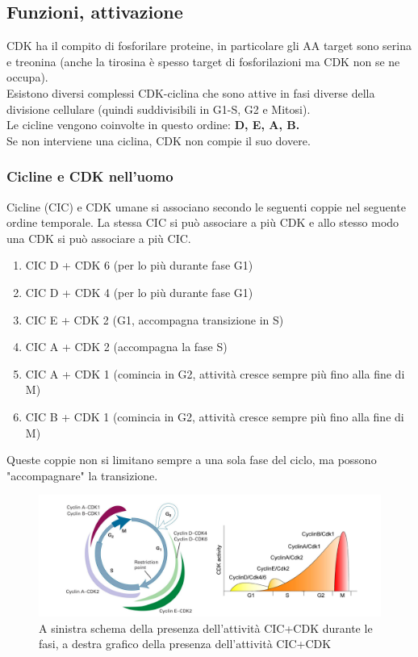     \subsection{Funzioni, attivazione}
        CDK ha il compito di fosforilare proteine, in particolare gli AA target sono serina e treonina (anche la tirosina è spesso target di fosforilazioni ma CDK non se ne occupa). \\
        Esistono diversi complessi CDK-ciclina che sono attive in fasi diverse della divisione cellulare (quindi suddivisibili in G1-S, G2 e Mitosi).\\
        Le cicline vengono coinvolte in questo ordine: \textbf{D, E, A, B.}\\
        Se non interviene una ciclina, CDK non compie il suo dovere.
        
        \subsubsection{Cicline e CDK nell'uomo}
            Cicline (CIC) e CDK umane si associano secondo le seguenti coppie nel seguente ordine temporale. La stessa CIC si può associare a più CDK e allo stesso modo una CDK si può associare a più CIC.
            \begin{enumerate}
                \item CIC D + CDK 6 (per lo più durante fase G1)
                \item CIC D + CDK 4 (per lo più durante fase G1)
                \item CIC E + CDK 2 (G1, accompagna transizione in S)
                \item CIC A + CDK 2 (accompagna la fase S)
                \item CIC A + CDK 1 (comincia in G2, attività cresce sempre più fino alla fine di M)
                \item CIC B + CDK 1 (comincia in G2, attività cresce sempre più fino alla fine di M)
            \end{enumerate}
            Queste coppie non si limitano sempre a una sola fase del ciclo, ma possono "accompagnare" la transizione.
            
            \begin{figure}[h]
                \centering
                \includegraphics[width=1\textwidth]{images/CIC_e_CDK.JPG}
                \caption{\small A sinistra schema della presenza dell'attività CIC+CDK durante le fasi, a destra grafico della presenza dell'attività CIC+CDK}
                \label{fig:mesh1}
            \end{figure}
            
